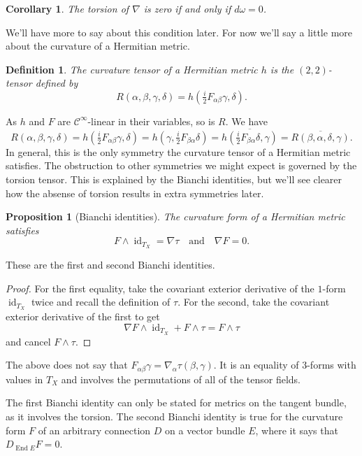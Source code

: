 \documentclass[10pt,a4paper]{article}
\newtheorem{prop}[theo]{Proposition}
\newtheorem{coro}[theo]{Corollary}
\newtheorem{defi}[theo]{Definition}
\newtheorem*{proof}{Proof}
\newcommand{\cc}[1]{\mathcal{#1}}
\DeclareMathOperator{\End}{End}
\DeclareMathOperator{\id}{id}
\begin{document}
\begin{coro}
\label{coro:kahler-zero-torsion}
The torsion of $\nabla$ is zero if and only if $d\omega = 0$.
\end{coro}


We'll have more to say about this condition later. For now we'll say a little more about the curvature of a Hermitian metric.


\begin{defi}
The \emph{curvature tensor} of a Hermitian metric $h$ is the $(2,2)$-tensor defined by
$$
R(\alpha,\beta,\gamma,\delta)
= h(\tfrac i2 F_{\alpha\beta}\gamma, \delta).
$$
\end{defi}

As $h$ and $F$ are $\cc C^\infty$-linear in their variables, so is $R$. We have
$$
R(\alpha,\beta,\gamma,\delta)
= h(\tfrac i2 F_{\alpha\beta}\gamma, \delta)
= h(\gamma, \tfrac i2 F_{\beta\alpha}\delta)
= \overline{h(\tfrac i2 F_{\beta\alpha}\delta, \gamma)}
= \overline{R(\beta,\alpha,\delta,\gamma)}.
$$
In general, this is the only symmetry the curvature tensor of a Hermitian metric satisfies. The obstruction to other symmetries we might expect is governed by the torsion tensor. This is explained by the Bianchi identities, but we'll see clearer how the absense of torsion results in extra symmetries later.


\begin{prop}[Bianchi identities]
The curvature form of a Hermitian metric satisfies
$$
F \wedge \id_{T_X} = \nabla \tau
\quad\text{and}\quad
\nabla F = 0.
$$
\end{prop}

These are the first and second Bianchi identities.

\begin{proof}
  For the first equality, take the covariant exterior derivative of the $1$-form $\id_{T_X}$ twice and recall the definition of $\tau$. For the second, take the covariant exterior derivative of the first to get
$$
\nabla F \wedge \id_{T_X} + F \wedge \tau = F \wedge \tau
$$
and cancel $F \wedge \tau$.
\end{proof}


The above does not say that $F_{\alpha\beta}\gamma = \nabla_\alpha \tau(\beta,\gamma)$. It is an equality of $3$-forms with values in $T_X$ and involves the permutations of all of the tensor fields.

The first Bianchi identity can only be stated for metrics on the tangent bundle, as it involves the torsion. The second Bianchi identity is true for the curvature form $F$ of an arbitrary connection $D$ on a vector bundle $E$, where it says that $D_{\End E} F = 0$.
\end{document}
